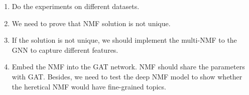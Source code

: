 \documentclass[english,onecolumn]{IEEEtran}
\begin{document}
%



\begin{enumerate}
		\item 	Do the experiments on different datasets.
 \item 	We need to prove that NMF solution is not unique.
 \item 	If the solution is not unique, we should implement the multi-NMF to the GNN to capture different features.
\item 	Embed the NMF into the GAT network. NMF should share the parameters with GAT.
Besides, we need to test the deep NMF model to show whether the heretical NMF would have fine-grained topics.
\end{enumerate}
	
\end{document}
